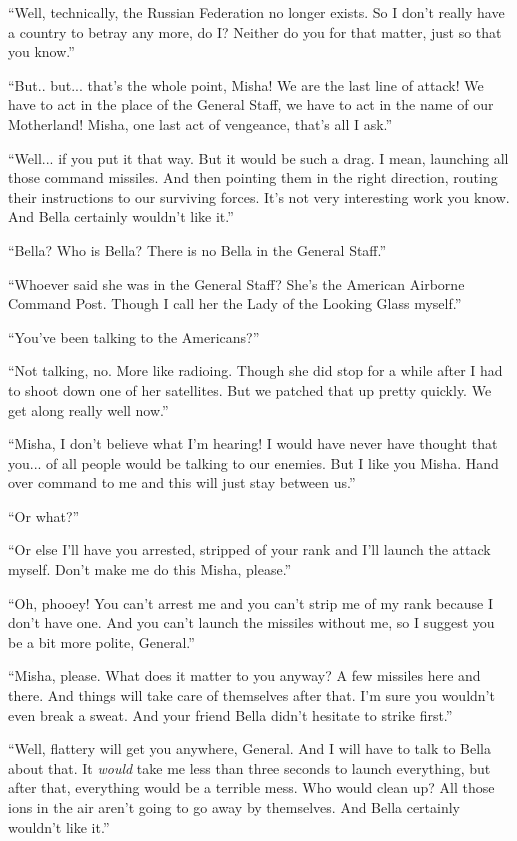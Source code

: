 \documentclass[11pt,letterpaper]{article}
\begin{document}
``Well, technically, the Russian Federation no longer exists. So I don't really have a country to betray any  more, do I? Neither do you for that matter, just so that you know.''

``But.. but... that's the whole point, Misha! We are the last line of attack! We have to act in the place of the General Staff, we have to act in the name of our Motherland! Misha, one last act of vengeance, that's all I ask.''

``Well... if you put it that way. But it would be such a drag. I mean, launching all those command missiles. And then pointing them in the right direction, routing their instructions to our surviving forces. It's not very interesting work you know. And Bella certainly wouldn't like it.''

``Bella? Who is Bella? There is no Bella in the General Staff.''

``Whoever said she was in the General Staff? She's the American Airborne Command Post. Though I call her the Lady of the Looking Glass myself.''

``You've been talking to the Americans?''

``Not talking, no. More like radioing. Though she did stop for a while after I had to shoot down one of her satellites. But we patched that up pretty quickly. We get along really well now.''

``Misha, I don't believe what I'm hearing! I would have never have thought that you... of all people would be talking to our enemies. But I like you Misha. Hand over command to me and this will just stay between us.''

``Or what?''

``Or else I'll have you arrested, stripped of your rank and I'll launch the attack myself. Don't make me do this Misha, please.''

``Oh, phooey! You can't arrest me and you can't strip me of my rank because I don't have one. And you can't launch the missiles without me, so I suggest you be a bit more polite, General.''

``Misha, please. What does it matter to you anyway? A few missiles here and there. And things will take care of themselves after that. I'm sure you wouldn't even break a sweat. And your friend Bella didn't hesitate to strike first.''

``Well, flattery will get you anywhere, General. And I will have to talk to Bella about that. It \textit{would} take me less than three seconds to launch everything, but after that, everything would be a terrible mess. Who would clean up? All those ions in the air aren't going to go away by themselves. And Bella certainly wouldn't like it.''
\end{document}

